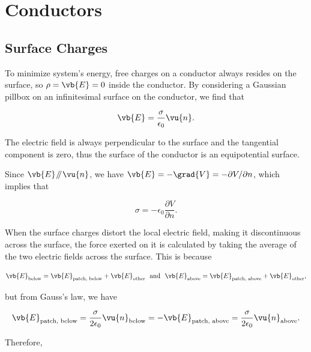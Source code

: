 \documentclass[english,a4paper,12pt]{report}
\begin{document}
\section{Conductors}

\subsection{Surface Charges} \label{surcha} 

To minimize system's energy, free charges on a conductor always resides on the surface, so \(\rho  = \vb{E}  = 0 \) inside the conductor. By considering a Gaussian pillbox on an infinitesimal surface on the conductor, we find that 

\begin{equation}
    \vb{E} = \frac{\sigma }{\epsilon_0} \vu{n}. 
\end{equation}

The electric field is always perpendicular to the surface and the tangential component is zero, thus the surface of the conductor is an equipotential surface.

Since \(\vb{E} \mathbin{\!/\mkern-5mu/\!} \vu{n} \), we have \(\vb{E} = - \grad{V} = - \partial V / \partial n\), which implies that 

\begin{equation}
    \sigma = -\epsilon _{0}\frac{\partial V}{\partial n}.  
\end{equation}

When the surface charges distort the local electric field, making it discontinuous across the surface, the force exerted on it is calculated by taking the average of the two electric fields across the surface. This is because

\begin{equation}
    \vb{E} _{\text{below} } = \vb{E} _{\text{patch, below} } + \vb{E} _{\text{other} } ~\text { and }~ \vb{E} _{\text{above} } = \vb{E} _{\text{patch, above} } + \vb{E} _{\text{other} },  
\end{equation}

but from Gauss's law, we have

\begin{equation}
    \vb{E} _{\text{patch, below} } = \frac{\sigma }{2 \epsilon _0}\vu{n} _{\text{below} } = - \vb{E} _{\text{patch, above} } = \frac{\sigma }{2 \epsilon _0}\vu{n} _{\text{above} }.    
\end{equation}

Therefore, 
\end{document}
